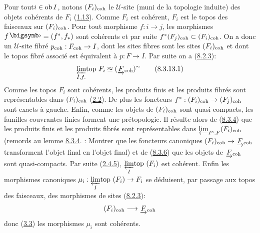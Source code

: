 \documentclass[10pt]{../fichiers-configuration-latex/smfart}
\begin{document}
Pour tout\pageoriginale $i \in \operatorname{ob} I$, notons $(F_i)_{\mathrm{coh}}$ le
$𝒰$-site (muni de la topologie induite) des objets cohérents de
$F_i$ (\hyperref[VI.def1.13]{1.13}). Comme $F_i$
est cohérent, $F_i$ est le topos des faisceaux sur $(F_i)_{\mathrm{coh}}$. Pour
tout morphisme $f : i \to j$, les morphismes $f\bigdot = (f^{\ast},
f_{\ast})$ sont cohérents et par suite $f^{\ast}(F_j)_{\mathrm{coh}} \subset
(F_i)_{\mathrm{coh}}$. On a donc un $𝒰$-site fibré $p_{\coh} : F_{\coh} \to I$,
dont les sites fibres sont les sites $(F_i)_{\mathrm{coh}}$ et dont le topos
fibré associé est équivalent à $p : F \to I$. Par suite on a (\hyperref[VI.thm8.2.3]{8.2.3}):
\begin{equation*}
{\displaystyle{\varprojlim_{I, f.}\!\mbox{\rm top }}} F_i \approxeq
(\underrightarrow{F}_{\mathrm{coh}})^{\sim}\tag{8.3.13.1}
\end{equation*}
Comme les topos $F_i$ sont cohérents, les produits finis et les
produits fibrés sont représentables dans $(F_i)_{\mathrm{coh}}$
(\hyperref[VI.prop2.2]{2.2}). De plus les foncteurs $f^{\ast} : (F_i)_{\coh}
\to (F_j)_{\coh}$ sont exacts à gauche. Enfin, comme les objets de
$(F_i)_{\mathrm{coh}}$ sont quasi-compacts, les familles couvrantes finies
forment une prétopologie. Il résulte alors de (\hyperref[VI.lem8.3.4]{8.3.4})
que les produits finis et les produits fibrés sont représentables
dans $\varprojlim_{I^{\circ},F} (F_i)_{\mathrm{coh}}$ (remords au lemme
\hyperref[VI.lem8.3.4]{8.3.4}. : Montrer que les foncteurs canoniques
$(F_i)_{\coh} \to \underrightarrow{F}_{\coh}$ transforment l'objet
final en l'objet final) et de (\hyperref[VI.prop8.3.6]{8.3.6}) que les objets de
$\underrightarrow{F}_{\mathrm{coh}}$ sont quasi-compacts. Par suite
(\hyperref[VI.subsubsec2.4.5]{2.4.5}), ${\displaystyle{\varprojlim_{I}\!\mbox{\rm top }}} (F_i)$  est cohérent. Enfin
les morphismes canoniques $\mu_{i} : \limtop{I}(F_i) \to F_i$ se
déduisent, par passage aux topos des faisceaux, des morphismes de
sites (\hyperref[VI.thm8.2.3]{8.2.3}):
$$
(F_i)_{\coh} \to \underrightarrow{F}_{\coh}
$$
donc (\hyperref[VI.cor3.3]{3.3}) les morphismes $\mu_i$ sont cohérents.
\end{document}
